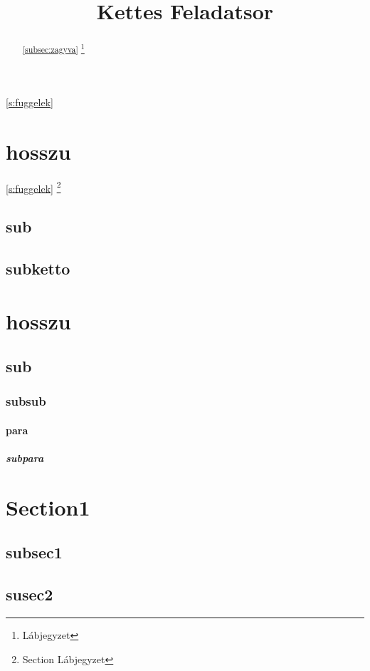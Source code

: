 \documentclass[twoside,15pt]{article}
\begin{document}
\autoref{s:fuggelek}


\setcounter{tocdepth}{5}
\title{Kettes Feladatsor}
\maketitle
{}
\begin{abstract}
\ref{subsec:zagyva}
\hulipsum[2]
\renewcommand{\thefootnote}{\fnsymbol{footnote}}
\footnote{Lábjegyzet}
\end{abstract}
\tableofcontents
\newpage
{}
\section[rovid]{hosszu} \label{sec:elsoszakasz}
\ref{s:fuggelek}
\pageref{s:fuggelek}
\renewcommand{\thefootnote}{\fnsymbol{footnote}}
\footnote{Section Lábjegyzet}
\hulipsum[1]
\label{s:section}
\hulipsum[2]
\subsection{sub} \label{subsec:alszakasz}
\hulipsum
\subsection{subketto}
\hulipsum
\setcounter{secnumdepth}{5}
\section{hosszu} \label{sec:szakaszb}
\subsection{sub}
\subsubsection{subsub}
\paragraph{para}
\subparagraph{subpara}
\label{s:subpara}
\appendix
\label{s:fuggelek}
\section{Section1}
\subsection{subsec1}
\quote
\hulipsum[2]
\subsection{susec2}
\quotation
\hulipsum[2]
\end{document}

